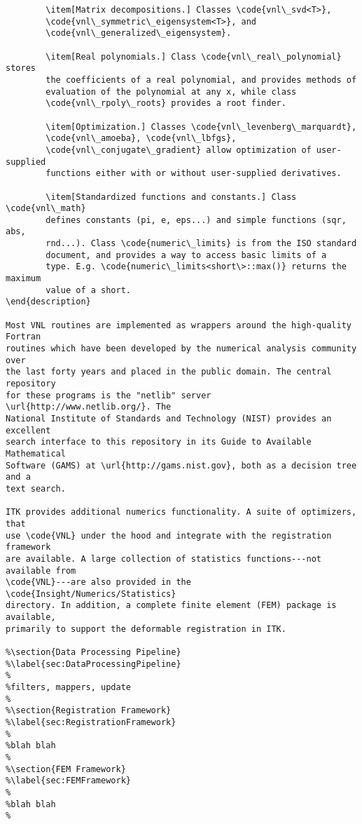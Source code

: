 \begin{verbatim}
        \item[Matrix decompositions.] Classes \code{vnl\_svd<T>}, 
        \code{vnl\_symmetric\_eigensystem<T>}, and 
        \code{vnl\_generalized\_eigensystem}. 

        \item[Real polynomials.] Class \code{vnl\_real\_polynomial} stores 
        the coefficients of a real polynomial, and provides methods of 
        evaluation of the polynomial at any x, while class 
        \code{vnl\_rpoly\_roots} provides a root finder. 

        \item[Optimization.] Classes \code{vnl\_levenberg\_marquardt},
        \code{vnl\_amoeba}, \code{vnl\_lbfgs},
        \code{vnl\_conjugate\_gradient} allow optimization of user-supplied
        functions either with or without user-supplied derivatives.

        \item[Standardized functions and constants.] Class \code{vnl\_math}
        defines constants (pi, e, eps...) and simple functions (sqr, abs,
        rnd...). Class \code{numeric\_limits} is from the ISO standard
        document, and provides a way to access basic limits of a
        type. E.g. \code{numeric\_limits<short\>::max()} returns the maximum
        value of a short.
\end{description}

Most VNL routines are implemented as wrappers around the high-quality Fortran
routines which have been developed by the numerical analysis community over
the last forty years and placed in the public domain. The central repository
for these programs is the "netlib" server \url{http://www.netlib.org/}. The
National Institute of Standards and Technology (NIST) provides an excellent
search interface to this repository in its Guide to Available Mathematical
Software (GAMS) at \url{http://gams.nist.gov}, both as a decision tree and a
text search.

ITK provides additional numerics functionality. A suite of optimizers, that
use \code{VNL} under the hood and integrate with the registration framework
are available. A large collection of statistics functions---not available from
\code{VNL}---are also provided in the \code{Insight/Numerics/Statistics}
directory. In addition, a complete finite element (FEM) package is available,
primarily to support the deformable registration in ITK.

%\section{Data Processing Pipeline}
%\label{sec:DataProcessingPipeline}
%
%filters, mappers, update
%
%\section{Registration Framework}
%\label{sec:RegistrationFramework}
%
%blah blah
%
%\section{FEM Framework}
%\label{sec:FEMFramework}
%
%blah blah
%

\end{verbatim}
